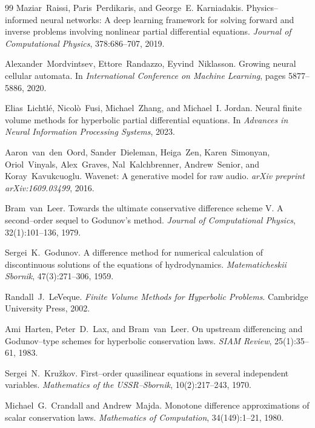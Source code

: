 \documentclass[10pt]{article}
\theoremstyle{definition}
\theoremstyle{remark}
\begin{document}
\begin{thebibliography}{99}
Maziar~Raissi, Paris~Perdikaris, and George~E. Karniadakis.
\newblock Physics--informed neural networks: A deep learning framework for
  solving forward and inverse problems involving nonlinear partial differential
  equations.
\newblock \emph{Journal of Computational Physics}, 378:686--707, 2019.

Alexander~Mordvintsev, Ettore~Randazzo, Eyvind~Niklasson.
\newblock Growing neural cellular automata.
\newblock In \emph{International Conference on Machine Learning}, pages
  5877--5886, 2020.

Elias~Lichtlé, Nicolò~Fusi, Michael~Zhang, and Michael~I. Jordan.
\newblock Neural finite volume methods for hyperbolic partial differential
  equations.
\newblock In \emph{Advances in Neural Information Processing Systems}, 2023.

Aaron~van~den~Oord, Sander~Dieleman, Heiga~Zen, Karen~Simonyan, Oriol~Vinyals,
  Alex~Graves, Nal~Kalchbrenner, Andrew~Senior, and Koray~Kavukcuoglu.
\newblock Wavenet: A generative model for raw audio.
\newblock \emph{arXiv preprint arXiv:1609.03499}, 2016.

Bram~van~Leer.
\newblock Towards the ultimate conservative difference scheme V. A second--order
  sequel to Godunov's method.
\newblock \emph{Journal of Computational Physics}, 32(1):101--136, 1979.

Sergei~K.~Godunov.
\newblock A difference method for numerical calculation of discontinuous
  solutions of the equations of hydrodynamics.
\newblock \emph{Matematicheskii Sbornik}, 47(3):271--306, 1959.

Randall~J.~LeVeque.
\newblock \emph{Finite Volume Methods for Hyperbolic Problems}.
\newblock Cambridge University Press, 2002.

Ami~Harten, Peter~D.~Lax, and Bram~van~Leer.
\newblock On upstream differencing and Godunov--type schemes for hyperbolic
  conservation laws.
\newblock \emph{SIAM Review}, 25(1):35--61, 1983.

Sergei~N.~Kru\v{z}kov.
\newblock First--order quasilinear equations in several independent
  variables.
\newblock \emph{Mathematics of the USSR--Sbornik}, 10(2):217--243, 1970.

Michael~G.~Crandall and Andrew~Majda.
\newblock Monotone difference approximations of scalar conservation laws.
\newblock \emph{Mathematics of Computation}, 34(149):1--21, 1980.


\end{thebibliography}
\end{document}
